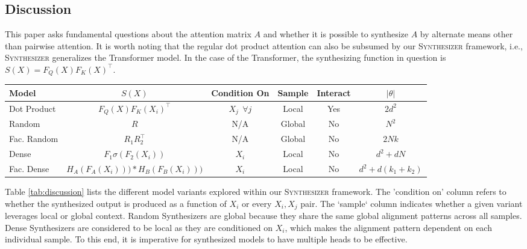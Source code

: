 \documentclass{article}
\begin{document}
\subsection{Discussion}
This paper asks fundamental questions about the attention matrix $A$ and whether it is possible to synthesize $A$ by alternate means other than pairwise attention. It is worth noting that the regular dot product attention can also be subsumed by our \textsc{Synthesizer} framework, i.e., \textsc{Synthesizer} generalizes the Transformer model. In the case of the Transformer, the synthesizing function in question is $S(X)=F_Q(X)F_K(X)^\top$.  
\begin{table*}

\small
    \centering
    \begin{tabular}{l|ccccc}
    \toprule
    \midrule
        Model &  $S(X)$ & Condition On & Sample & Interact & $|\theta|$\\
        \midrule
        Dot Product & $F_Q(X)F_K(X_i)^\top$ & $X_j \:\: \forall j$ & Local & Yes &  $2d^2$\\
        \midrule
        Random & $R$ & N/A & Global & No & $N^2$\\
        Fac. Random & $R_1R_2^\top$ &  N/A & Global & No & $2N k$\\
         Dense & $F_1\sigma(F_2(X_i))$ & $X_i$ & Local & No & $d^2 + dN$\\
          Fac. Dense & $H_{A}(F_A(X_i))) * H_{B}(F_B(X_i)))$ & $X_i$ & Local & No & $d^2 + d(k_1+k_2)$\\
         \bottomrule
    \end{tabular}
    \caption{Overview of all Synthesizing Functions.}
    \label{tab:discussion}
\end{table*}
Table \ref{tab:discussion} lists the different model variants explored within our \textsc{Synthesizer} framework. The 'condition on' column refers to whether the synthesized output is produced as a function of $X_i$ or every $X_i, X_j$ pair. The `sample` column indicates whether a given variant leverages local or global context. Random Synthesizers are global because they share the same global alignment patterns across all samples. Dense Synthesizers are considered to be local as they are conditioned on $X_i$, which makes the alignment pattern dependent on each individual sample. To this end, it is imperative for synthesized models to have multiple heads to be effective. 
\end{document}
